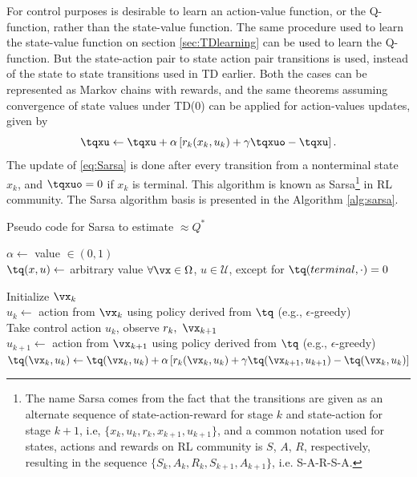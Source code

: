 For control purposes is desirable to learn an action-value function, or the Q-function, rather than the state-value function. The same procedure used to learn the state-value function on section \eqref{sec:TDlearning} can be used to learn the Q-function. But the state-action pair to state action pair transitions is used, instead of the state to state transitions used in TD earlier. Both the cases can be represented as Markov chains with rewards, and the same theorems assuming convergence of state values under TD(0) can be applied for action-values updates, given by
\begin{equation}
  \tqxu \gets \tqxu + \alpha\left[r_k(x_k,u_k) + \gamma \tqxuo - \tqxu\right]
\label{eq:Sarsa}.
\end{equation}
The update of \eqref{eq:Sarsa} is done after every transition from a nonterminal state $x_k$, and $\tqxuo = 0$ if $x_k$ is terminal. This algorithm is known as 
Sarsa\footnote{The name Sarsa comes from the fact that the transitions are given as an alternate sequence of state-action-reward for stage $k$ and state-action for stage $k+1$, i.e,  $\{x_k,u_k,r_k,x_{k+1},u_{k+1}\}$, and a common notation used for states, actions and rewards on RL community is $S$,  $A$,  $R$, respectively, resulting in the sequence $\{ S_k, A_k, R_k, S_{k+1}, A_{k+1} \}$, i.e. S-A-R-S-A.} 
in RL community. The Sarsa algorithm basis is presented in the Algorithm \ref{alg:sarsa}.

\begin{algorithm} %
  \caption{Pseudo code for Sarsa to estimate $\approx Q^*$ } \label{alg:sarsa}
  \DontPrintSemicolon

  $\alpha \gets  $ value $ \in  (0,1)$ \\
  $\tq(x,u) \gets$ arbitrary value $\forall \vx \in \Omega$, $u \in \mathcal{U}$, except for $\tq(terminal,\cdot) = 0$

  {
    Initialize $\vx_k$ \\
    $u_k \gets$ action from $\vx_k$ using policy derived from $\tq$ (e.g.,  $\epsilon$-greedy) \\
    {
      Take control action $u_k$, observe $r_k,\ \vx_{k+1}$ \\
      $u_{k+1} \gets$ action from $\vx_{k+1}$ using policy derived from $\tq$ (e.g.,  $\epsilon$-greedy) \\
      $\tq(\vx_k,u_k) \gets \tq(\vx_k,u_k) + \alpha\left[r_k(\vx_k,u_k) + \gamma \tq(\vx_{k+1},u_{k+1}) - \tq(\vx_k,u_k)\right]$ \\
    }
  }
\end{algorithm}

